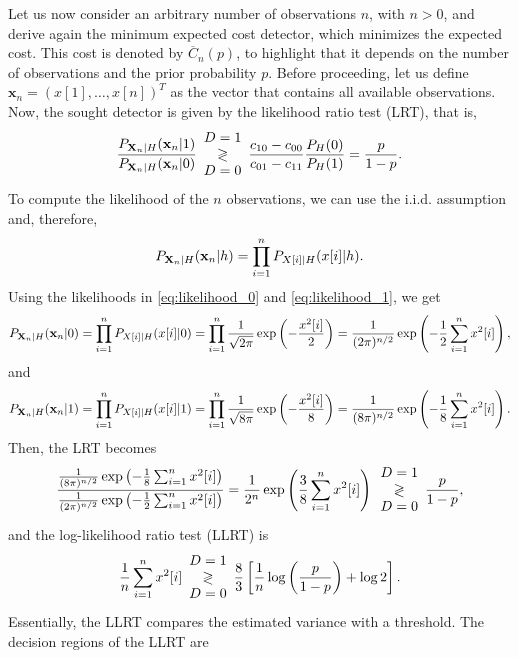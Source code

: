 Let us now consider an arbitrary number of observations $n$, with $n >0$, and derive again the minimum expected cost detector, which minimizes the expected cost. This cost is denoted by $\overline{C}_n(p)$, to highlight that it depends on the number of observations and the prior probability $p$. Before proceeding, let us define $\mathbf{x}_n = (x[1], \ldots, x[n])^T$ as the vector that contains all available observations. Now, the sought detector is given by the likelihood ratio test (LRT), that is,
\begin{equation*}
	\frac{P_{{\bf X}_n|H}({\bf x}_n|1)}{P_{{\bf X}_n|H}({\bf x}_n|0)}\begin{array}{c} D=1 \\ \gtrless \\ D=0 \end{array} \frac{c_{10}-c_{00}}{c_{01}-c_{11}} \frac{P_H(0)}{P_H(1)} = \frac{p}{1 - p}.
\end{equation*}
To compute the likelihood of the $n$ observations, we can use the i.i.d. assumption and, therefore,
\begin{equation*}
	P_{{\bf X}_n|H}({\bf x}_n|h) = \prod_{i = 1}^{n} P_{X[i]|H}( x[i] | h).
\end{equation*}
Using the likelihoods in \eqref{eq:likelihood_0} and \eqref{eq:likelihood_1}, we get
\begin{equation*}
	P_{{\bf X}_n|H}({\bf x}_n|0) = \prod_{i = 1}^{n} P_{X[i]|H}( x[i] | 0) = \prod_{i = 1}^{n} \frac{1}{\sqrt{2 \pi}} \exp \left(-\frac{x^2[i]}{2}\right) = \frac{1}{(2 \pi)^{n/2}} \exp \left(-\frac{1}{2} \sum_{i = 1}^{n} x^2[i]\right),
\end{equation*}
and
\begin{equation*}
	P_{{\bf X}_n|H}({\bf x}_n|1) = \prod_{i = 1}^{n} P_{X[i]|H}( x[i] | 1) = \prod_{i = 1}^{n} \frac{1}{\sqrt{8 \pi}} \exp \left(-\frac{x^2[i]}{8}\right) = \frac{1}{(8 \pi)^{n/2}} \exp \left(-\frac{1}{8} \sum_{i = 1}^{n} x^2[i]\right).
\end{equation*}
Then, the LRT becomes
\begin{equation*}
	\frac{\frac{1}{(8 \pi)^{n/2}} \exp \left(-\frac{1}{8} \sum_{i = 1}^{n} x^2[i]\right)}{\frac{1}{(2 \pi)^{n/2}} \exp \left(-\frac{1}{2} \sum_{i = 1}^{n} x^2[i]\right)} = \frac{1}{2^{n}} \exp \left(\frac{3 }{8} \sum_{i = 1}^{n} x^2[i]\right) \begin{array}{c} D=1 \\ \gtrless \\ D=0 \end{array} \frac{p}{1 - p},
\end{equation*}
and the log-likelihood ratio test (LLRT) is
\begin{equation*}
  \frac{1}{n} \sum_{i = 1}^{n} x^2[i] \begin{array}{c} D=1 \\ \gtrless \\ D=0 \end{array} \frac{8}{3} \left[\frac{1}{n} \log \left(\frac{p}{1 - p}  \right) + \log 2 \right].
\end{equation*}
Essentially, the LLRT compares the estimated variance with a threshold. The decision regions of the LLRT are
